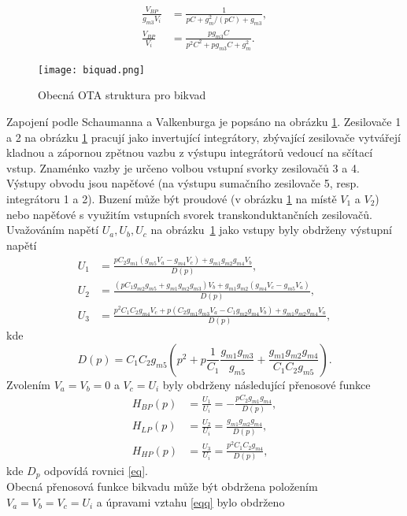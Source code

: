 \begin{align}
\frac{V_{BP}}{g_{m3}V_i} &= \frac{1}{pC + g_m^2/(pC) + g_{m3}},\\
\frac{V_{BP}}{V_i} &= \frac{pg_{m3}C}{p^2C^2 + pg_{m3}C + g_m^2}.
\end{align}
\begin{figure}[h]
\centering
\texttt{[image: biquad.png]}
\caption[Obecná OTA struktura pro bikvad]{Obecná OTA struktura pro bikvad \label{s:BIK}}
\end{figure}
\noindent Zapojení podle Schaumanna a Valkenburga \cite{13} je popsáno na obrázku \ref{s:BIK}. Zesilovače 1 a 2 na obrázku \ref{s:BIK} pracují jako invertující integrátory, zbývající zesilovače vytvářejí kladnou a zápornou zpětnou vazbu z výstupu integrátorů vedoucí na sčítací vstup. Znaménko vazby je určeno volbou vstupní svorky zesilovačů 3 a 4. Výstupy obvodu jsou napěťové (na výstupu sumačního zesilovače 5, resp. integrátoru 1 a 2). Buzení může být proudové (v obrázku \ref{s:BIK} na místě $V_1$ a $V_2$) nebo napěťové s využitím vstupních svorek transkonduktančních zesilovačů. Uvažováním napětí $U_a, U_b, U_c$ na obrázku~\ref{s:BIK} jako vstupy byly obdrženy výstupní napětí
\begin{align}
U_1 &= \frac{pC_2g_{m1}(g_{m5}V_a - g_{m4}V_c) + g_{m1}g_{m2}g_{m4}V_b}{D(p)},\\
U_2 &= \frac{(pC_1g_{m2}g_{m5} + g_{m1}g_{m2}g_{m3})V_b + g_{m1}g_{m2}(g_{m4}V_c - g_{m5}V_a)}{D(p)},\\
U_3 &= \frac{p^2C_1C_2g_{m4}V_c + p(C_2g_{m1}g_{m3}V_a - C_1g_{m2}g_{m4}V_b) + g_{m1}g_{m2}g_{m4}V_a}{D(p)},\label{eqq}
\end{align}\label{s:V3}
kde
\begin{equation}
D(p) = C_1C_2g_{m5}(p^2 + p\frac{1}{C_1}\frac{g_{m1}g_{m3}}{g_{m5}} + \frac{g_{m1}g_{m2}g_{m4}}{C_1C_2g_{m5}})\label{eq}.
\end{equation}
\noindent Zvolením $V_a = V_b = 0$ a $V_c = U_i$ byly obdrženy následující přenosové funkce
\begin{align}
H_{BP}(p) &= \frac{U_1}{U_i} = - \frac{pC_2g_{m1}g_{m4}}{D(p)},\\
H_{LP}(p) &= \frac{U_2}{U_i} = \frac{g_{m1}g_{m2}g_{m4}}{D(p)},\\
H_{HP}(p) &= \frac{U_3}{U_i} = \frac{p^2C_1C_2g_{m4}}{D(p)},
\end{align}
kde $D_p$ odpovídá rovnici \ref{eq}.\\
Obecná přenosová funkce bikvadu může být obdržena položením $V_a = V_b = V_c = U_i$ a úpravami vztahu \ref{eqq} bylo obdrženo
